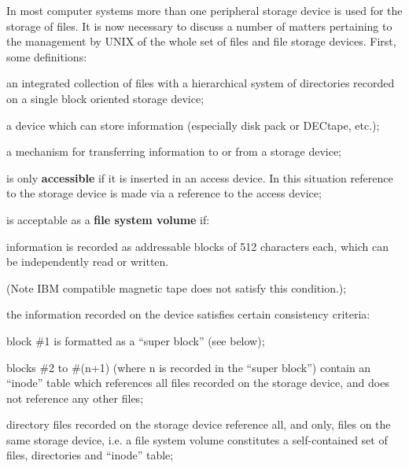 %
%

In most computer systems more than  one
peripheral  storage  device is used for
the storage of files. It is now  necessary  to  discuss  a  number of matters
pertaining to the management by UNIX of
the whole set of files and file storage
devices. First, some definitions:

\bd
\item[file system:] an integrated collection  of files with a hierarchical
system of directories recorded  on
a  single  block  oriented storage
device;

\item[storage device:] a device which can
store information (especially disk
pack or DECtape, etc.);

\item[access  device:]  a  mechanism  for
transferring   information  to  or
from a storage device;

\item[a  storage   device]    is    only
{\bf accessible} if it is inserted in an
access device.  In this situation
reference to the storage device is
made via a reference to the access
device;

\item[a storage device] is acceptable  as
a {\bf file system volume} if:

\bd
\item[(a)]  information   is   recorded   as
     addressable  blocks of 512 characters  each,   which   can   be
     independently read or written.

(Note  IBM  compatible  magnetic
tape  does not satisfy this condition.);

\item[(b)] the information recorded  on  the
     device  satisfies  certain  consistency criteria:

block \#1 is formatted as a ``super block'' (see below);

blocks \#2 to \#(n+1)  (where n  is
recorded  in  the ``super block'')
contain an ``inode''  table  which
references all files recorded on
the storage device, and does not
reference any other files;

directory files recorded on  the
storage  device  reference  all,
and  only,  files  on  the  same
storage device, i.e. a file system volume
constitutes  a  self-contained  set  of files,
directories and ``inode'' table;
\ed

